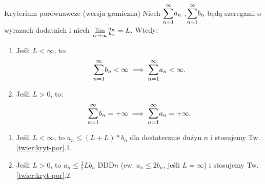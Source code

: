 \documentclass{article}
\numberwithin{defi}{section}
\numberwithin{defi}{section}
\newcommand{\oo}{\infty}
\providecommand{\half}{\frac{1}{2}}
\newcommand{\bsum}[2]{\mathlarger{\sum_{#1}^{#2}}}
\newcommand{\szerI}[1]{\bsum{n=1}{\oo} #1_n}
\begin{document}
\begin{twier}{Kryterium porównawcze (wersja graniczna)}
    Niech $\szerI{a}$ ,$\szerI{b}$ będą szeregami o wyrazach dodatnich i niech $\mathlarger{\lim}_{n \to \oo} \frac{a_n}{b_n} = L$. Wtedy: \begin{enumerate}
        \item Jeśli $L < \oo$, to: \begin{equation}
            \szerI{b} < \oo \implies \szerI{a} < \oo.
        \end{equation}
        \item Jeśli $ L > 0$, to: \begin{equation}
            \szerI{b} = +\oo \implies \szerI{a} = +\oo.
        \end{equation}
    \end{enumerate}
\end{twier}


\begin{dow}
    \begin{enumerate}
        \item Jeśli $L < \oo$, to $a_n \leqslant  (L + L) * b_n$ dla dostatecznie dużyn $n$ i stosujemy  Tw. \ref{twier:kryt-por}.1.
        \item Jeśli $L > 0$, to $a_n \leqslant \half L b_n$ DDD$n$ (ew. $a_n \leqslant 2 b_n$, jeśli $L = \oo$) i stosujemy Tw. \ref{twier:kryt-por}.2.
    \end{enumerate}
\end{dow}
\end{document}
